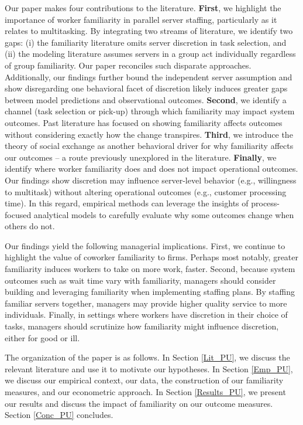  Our paper makes four contributions to the literature. \textbf{First}, we highlight the importance of worker familiarity in parallel server staffing, particularly as it relates to multitasking. By integrating two streams of literature, we identify two gaps: (i) the familiarity literature omits server discretion in task selection, and (ii) the modeling literature assumes servers in a group act individually regardless of group familiarity. Our paper reconciles such disparate approaches. Additionally, our findings further bound the independent server assumption and show disregarding one behavioral facet of discretion likely induces greater gaps between model predictions and observational outcomes. \textbf{Second}, we identify a channel (task selection or pick-up) through which familiarity may impact system outcomes. Past literature has focused on showing familiarity affects outcomes without considering exactly how the change transpires. \textbf{Third}, we introduce the theory of social exchange as another behavioral driver for why familiarity affects our outcomes -- a route previously unexplored in the literature. \textbf{Finally}, we identify where worker familiarity does and does not impact operational outcomes. Our findings show discretion may influence server-level behavior (e.g., willingness to multitask) without altering operational outcomes (e.g., customer processing time). In this regard, empirical methods can leverage the insights of process-focused analytical models to carefully evaluate why some outcomes change when others do not. 
 
 Our findings yield the following managerial implications. First, we continue to highlight the value of coworker familiarity to firms. Perhaps most notably, greater familiarity induces workers to take on more work, faster. Second, because system outcomes such as wait time vary with familiarity, managers should consider building and leveraging familiarity when implementing staffing plans. By staffing familiar servers together, managers may provide higher quality service to more individuals. Finally, in settings where workers have discretion in their choice of tasks, managers should scrutinize how familiarity might influence discretion, either for good or ill.
 
 The organization of the paper is as follows. In Section \ref{Lit_PU}, we discuss the relevant literature and use it to motivate our hypotheses. In Section \ref{Emp_PU}, we discuss our empirical context, our data, the construction of our familiarity measures, and our econometric approach. In Section \ref{Results_PU}, we present our results and discuss the impact of familiarity on our outcome measures. Section \ref{Conc_PU} concludes.
 
